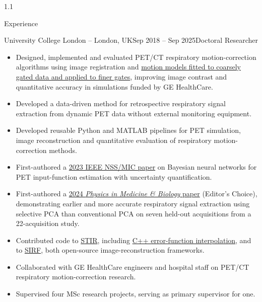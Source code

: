 \documentclass{cv}
\begin{document}
\begin{spacing}{1.1}
\begin{rSection}{Experience}
            \item \begin{rSubsection}{University College London \textnormal{-- London, UK}}{Sep 2018 -- Sep 2025}{Doctoral Researcher}{}        
                \item \begin{itemize}
                    \item Designed, implemented and evaluated PET/CT respiratory motion-correction algorithms using image registration and \href{https://doi.org/10.1109/NSS/MIC44845.2022.10399154}{motion models fitted to coarsely gated data and applied to finer gates}, improving image contrast and quantitative accuracy in simulations funded by GE HealthCare.
                    \item Developed a data-driven method for retrospective respiratory signal extraction from dynamic PET data without external monitoring equipment.
                    \item Developed reusable Python and MATLAB pipelines for PET simulation, image reconstruction and quantitative evaluation of respiratory motion-correction methods.
                    \item First-authored a \href{https://doi.org/10.1109/NSSMICRTSD49126.2023.10338687}{2023 IEEE NSS/MIC paper} on Bayesian neural networks for PET input-function estimation with uncertainty quantification.
                    \item First-authored a \href{https://doi.org/10.1088/1361-6560/ad5ef1}{2024 \textit{Physics in Medicine \& Biology} paper} (Editor's Choice), demonstrating earlier and more accurate respiratory signal extraction using selective PCA than conventional PCA on seven held-out acquisitions from a 22-acquisition study.
                    \item Contributed code to \href{https://github.com/UCL/STIR}{STIR}, including \href{https://github.com/UCL/STIR/blob/a56de48ecb020547ea40ccb992e956757a8c5006/src/include/stir/numerics/FastErf.inl}{C++ error-function interpolation}, and to \href{https://github.com/SyneRBI/SIRF}{SIRF}, both open-source image-reconstruction frameworks.
                    \item Collaborated with GE HealthCare engineers and hospital staff on PET/CT respiratory motion-correction research.
                    \item Supervised four MSc research projects, serving as primary supervisor for one.
                \end{itemize}
            \end{rSubsection}
        

\end{rSection}
\end{spacing}
\end{document}
